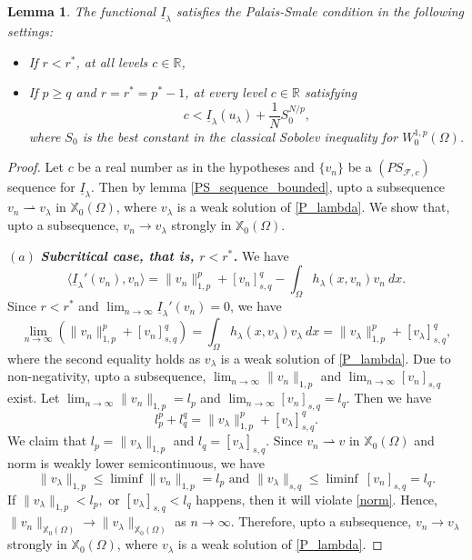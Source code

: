 \documentclass[reqno,oneside]{amsart}
\newtheorem{lemma}[theorem]{Lemma}
\theoremstyle{definition}
\theoremstyle{remark}
\numberwithin{equation}{section}
\newcommand{\Om} {\Omega}
\newcommand{\sr}{\mathbb{R}}
\newcommand{\rar}{\rightarrow}
\newcommand{\xo}{\mathbb{X}_0}
\newcommand{\ti}{\underline{I}_{\la}}
\newcommand{\wop}{W^{1,p}_0 (\Omega)}
\newcommand{\la} {\lambda}
\begin{document}
\begin{lemma}\label{PS lemma}
    The functional $\ti$ satisfies the Palais-Smale condition in the following settings:
    \begin{itemize}
        \item[\textit{(a)}] If $r< r^*$, at all levels $c \in \sr$,

        \item[\textit{(b)}] If $p\geq q$ and $r=r^* = p^* -1$, at every level $c \in \sr$ satisfying
        \[c< \ti (u_{\la}) + \frac{1}{N} S_0^{N/p},\]
        where $S_0$ is the best constant in the classical Sobolev inequality for $\wop$.
    \end{itemize}
\end{lemma}

\begin{proof}
    Let $c$ be a real number as in the hypotheses and $\{v_n\}$ be a $(PS_{\mathcal{F}, c})$ sequence for $\ti$. Then by lemma \ref{PS_sequence_bounded}, upto a subsequence $v_n \rightharpoonup v_{\la}$ in $\xo(\Om)$, where $v_{\la}$ is a weak solution of \eqref{P_lambda}. We show that, upto a subsequence, $v_n \rar v_{\la}$ strongly in $\xo(\Om)$.
    \vspace{5pt}
    
    \noindent$(a)$ \textit{\textbf{Subcritical case, that is, $r<r^*$.}} We have
    \begin{equation*}
        \langle \ti' (v_n), v_n \rangle = \|v_n\|_{1,p}^p + [v_n]_{s,q}^q - \int_{\Om} h_{\la} \left(x, v_n \right) v_n\ dx.
    \end{equation*}
    Since $r< r^*$ and $\lim_{n\rar\infty} \ti' (v_n) =0$, we have
    \[\lim_{n\rar\infty} (\|v_n\|_{1,p}^p + [v_n]_{s,q}^q) = \int_{\Om} h_{\la} (x,v_{\la}) v_{\la}\ dx = \|v_{\la}\|_{1,p}^p + [v_{\la}]_{s,q}^q,\]
    where the second equality holds as $v_{\la}$ is a weak solution of \eqref{P_lambda}. Due to non-negativity, upto a subsequence, $\lim_{n\rar\infty} \| v_n\|_{1,p}$ and $\lim_{n\rar\infty} [v_n]_{s,q}$ exist. Let $\lim_{n\rar\infty} \| v_n\|_{1,p} = l_p$ and $\lim_{n\rar\infty} [v_n]_{s,q} = l_q$. Then we have
    \begin{equation}\label{norm}
        l_p^p + l_q^q = \|v_{\la}\|_{1,p}^p + [v_{\la}]_{s,q}^q.
    \end{equation}
    We claim that $l_p= \|v_{\la}\|_{1,p}$ and $l_q = [v_{\la}]_{s,q}$. Since $v_n \rightharpoonup v$ in $\xo(\Om)$ and norm is weakly lower semicontinuous, we have
    \[\|v_{\la}\|_{1,p} \leq \liminf \|v_n\|_{1,p} = l_p \text{ and } \|v_{\la}\|_{s,q} \leq \liminf\ [v_n]_{s,q} = l_q.\]
    If $\|v_{\la}\|_{1,p} < l_p,$ or  $[v_{\la}]_{s,q} < l_q$ happens, then it will violate \eqref{norm}. Hence, $\|v_n\|_{\xo(\Om)} \rar \|v_{\la}\|_{\xo(\Om)}$ as $n\rar\infty$. Therefore, upto a subsequence, $v_n \rar v_{\la}$ strongly in $\xo(\Om)$, where $v_{\la}$ is a weak solution of \eqref{P_lambda}.
    \vspace{5pt}
    

\end{proof}
\end{document}
